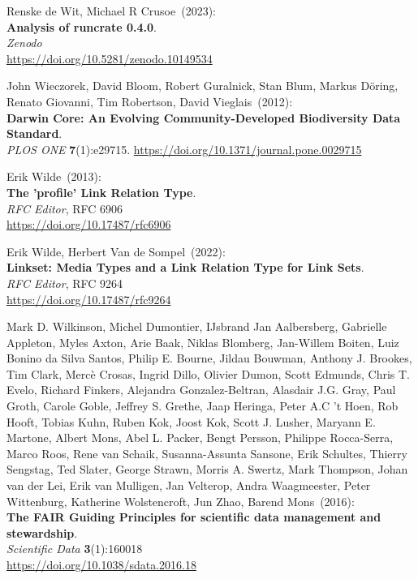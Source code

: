 \begin{thebibliography}{9}
Renske de Wit, Michael R Crusoe~(2023): \\
\textbf{Analysis of runcrate 0.4.0}.\\
\emph{Zenodo}\\
\url{https://doi.org/10.5281/zenodo.10149534}

John Wieczorek, David Bloom, Robert Guralnick, Stan Blum, Markus Döring,
Renato Giovanni, Tim Robertson, David Vieglais~(2012): \\
\textbf{Darwin {Core}: {An Evolving Community-Developed Biodiversity Data Standard}}.\\
\emph{PLOS ONE} \textbf{7}(1):e29715.
\url{https://doi.org/10.1371/journal.pone.0029715}

Erik Wilde~(2013): \\
\textbf{The 'profile' Link Relation Type}.\\
\emph{RFC Editor}, RFC 6906\\
\url{https://doi.org/10.17487/rfc6906}

Erik Wilde, Herbert Van de Sompel~(2022): \\
\textbf{Linkset: Media Types and a Link Relation Type for Link Sets}.\\
\emph{RFC Editor}, RFC 9264\\
\url{https://doi.org/10.17487/rfc9264}

Mark D. Wilkinson, Michel Dumontier, IJsbrand Jan
Aalbersberg, Gabrielle Appleton, Myles Axton, Arie Baak, Niklas
Blomberg, Jan-Willem Boiten, Luiz Bonino da Silva Santos, Philip E.
Bourne, Jildau Bouwman, Anthony J. Brookes, Tim Clark, Mercè Crosas,
Ingrid Dillo, Olivier Dumon, Scott Edmunds, Chris T. Evelo, Richard
Finkers, Alejandra Gonzalez-Beltran, Alasdair J.G. Gray, Paul Groth,
Carole Goble, Jeffrey S. Grethe, Jaap Heringa, Peter A.C 't Hoen, Rob
Hooft, Tobias Kuhn, Ruben Kok, Joost Kok, Scott J. Lusher, Maryann E.
Martone, Albert Mons, Abel L. Packer, Bengt Persson, Philippe
Rocca-Serra, Marco Roos, Rene van Schaik, Susanna-Assunta Sansone, Erik
Schultes, Thierry Sengstag, Ted Slater, George Strawn, Morris A. Swertz,
Mark Thompson, Johan van der Lei, Erik van Mulligen, Jan Velterop, Andra
Waagmeester, Peter Wittenburg, Katherine Wolstencroft, Jun Zhao, Barend
Mons~(2016): \\
\textbf{The FAIR Guiding Principles for scientific data management and
stewardship}.\\
\emph{Scientific Data} \textbf{3}(1):160018\\
\url{https://doi.org/10.1038/sdata.2016.18}


\end{thebibliography}
